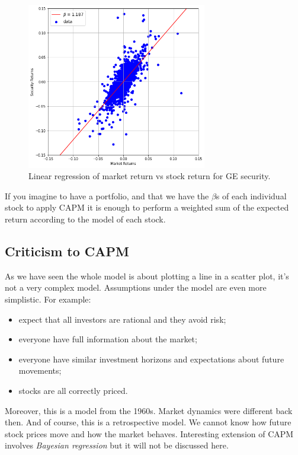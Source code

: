 \begin{figure}[htbp]
\centering
\includegraphics[width=0.7\textwidth]{figures/capm_fit}
\caption{Linear regression of market return vs stock return for GE security.}
\label{fig:capm_fit}
\end{figure}

If you imagine to have a portfolio, and that we have the $\beta$s of each individual stock to apply CAPM it is enough to perform a weighted sum of the expected return according to the model of each stock.

\subsection{Criticism to CAPM}
As we have seen the whole model is about plotting a line in a scatter plot, it’s not a very complex model. Assumptions under the model are even more simplistic. For example:
\begin{itemize}
	\tightlist
	\item expect that all investors are rational and they avoid risk;
	\item everyone have full information about the market;
	\item everyone have similar investment horizons and expectations about future movements;
	\item stocks are all correctly priced.
\end{itemize}

Moreover, this is a model from the 1960s. Market dynamics were different back then. And of course, this is a retrospective model. We cannot know how future stock prices move and how the market behaves.
Interesting extension of CAPM involves \emph{Bayesian regression}\cite{bib:bayesian_regression} but it will not be discussed here.

